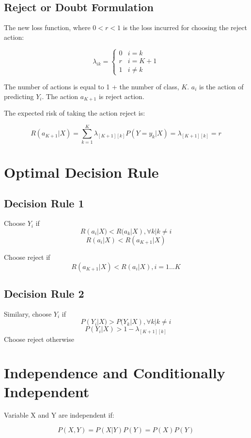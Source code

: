 \begin{multicols*}{2}
\subsection{Reject or Doubt Formulation}
\noindent The new loss function, where $0 < r < 1$ is the loss incurred for choosing the reject action:

$$
\lambda_{ik} = 
\begin{cases}
0 & i=k\\
r & i = K + 1 \\
1 & i \ne k
\end{cases}
$$

\noindent The number of actions is equal to 1 + the number of class, $K$. $a_{i}$ is the action of predicting $Y_{i}$. The action $a_{K+1}$ is reject action. 

\noindent The expected risk of taking the action reject is:

$$R(a_{K+1}|X) = \sum_{k=1}^K \lambda_{[K+1][k]} P(Y=y_k|X) = \lambda_{[K+1][k]} = r$$

\section{Optimal Decision Rule}

\subsection{Decision Rule 1}

\noindent Choose $Y_{i}$ if 
$$R(a_{i}|X) < R(a_{k}|X), \forall k|k \ne i$$
$$R(a_{i}|X) < R(a_{K+1}|X)$$

\noindent Choose reject if
$$R(a_{K+1}|X) < R(a_{i}|X), i=1...K$$

\subsection{Decision Rule 2}

\noindent Similary, choose $Y_{i}$ if 
$$P(Y_{i}|X) > P(Y_{k}|X), \forall k|k \ne i$$
$$P(Y_{i}|X) > 1 - \lambda_{[K+1][k]}$$
\noindent Choose reject otherwise

\section{Independence and Conditionally Independent}

\noindent Variable X and Y are independent if:

$$P(X,Y)=P(X|Y) P(Y) = P(X) P(Y)$$


\end{multicols*}
